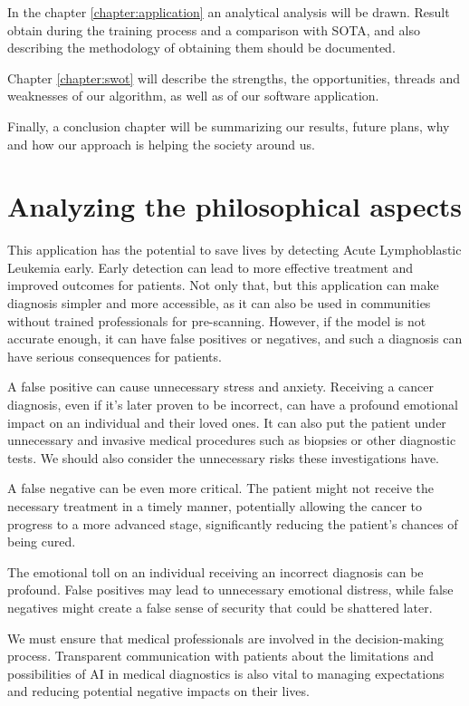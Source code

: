\documentclass[runningheads,a4paper,11pt]{report}
\begin{document}
In the chapter \ref{chapter:application} an analytical analysis will be drawn. Result obtain during the training process and a comparison with SOTA, and also describing the methodology of obtaining them should be documented.

Chapter \ref{chapter:swot} will describe the strengths, the opportunities, threads and weaknesses of our algorithm, as well as of our software application.

Finally, a conclusion chapter will be summarizing our results, future plans, why and how our approach is helping the society around us.

\section{Analyzing the philosophical aspects}
\label{section:philosophicalAspects}

This application has the potential to save lives by detecting Acute Lymphoblastic Leukemia early. Early detection can lead to more effective treatment and improved outcomes for patients. Not only that, but this application can make diagnosis simpler and more accessible, as it can also be used in communities without trained professionals for pre-scanning. However, if the model is not accurate enough, it can have false positives or negatives, and such a diagnosis can have serious consequences for patients.

A false positive can cause unnecessary stress and anxiety. Receiving a cancer diagnosis, even if it's later proven to be incorrect, can have a profound emotional impact on an individual and their loved ones. It can also put the patient under unnecessary and invasive medical procedures such as biopsies or other diagnostic tests. We should also consider the unnecessary risks these investigations have. 

A false negative  can be even more critical. The patient might not receive the necessary treatment in a timely manner, potentially allowing the cancer to progress to a more advanced stage, significantly reducing the patient's chances of being cured.

The emotional toll on an individual receiving an incorrect diagnosis can be profound. False positives may lead to unnecessary emotional distress, while false negatives might create a false sense of security that could be shattered later.

We must ensure that medical professionals are involved in the decision-making process. Transparent communication with patients about the limitations and possibilities of AI in medical diagnostics is also vital to managing expectations and reducing potential negative impacts on their lives.
\end{document}
